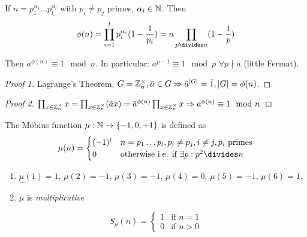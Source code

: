 \documentclass[NumTh.tex]{subfiles}
\begin{document}
\begin{prop}
  If $n = p_1^{\alpha_1} \dots p_l^{\alpha_l}$ with $p_i \neq p_j$ primes, $\alpha_i \in \mathbb{N}$.
  Then
  \[ \phi(n) = \prod_{i=1}^l p_i^{\alpha_i} (1 - \frac{1}{p_i}) = n \prod_{p\divides n} (1 - \frac{1}{p}) \]
\end{prop}

\begin{theorem}
  Then $a^{\phi(n)} \equiv 1 \mod n$.
  In particular: $a^{p-1} \equiv 1 \mod p$ $\forall p \nmid a$ (little Fermat).
\end{theorem}

\begin{proof}[Proof 1]
  Lagrange's Theorem, $G = \Z_n^\times, \overbar{a} \in G \Rightarrow \overbar{a}^{|G|} = \overbar{1}, |G| = \phi(n)$.
\end{proof}

\begin{proof}[Proof 2]
  $\prod_{x \in \Z_n^\times} x = \prod_{x \in \Z_n^\times} (\overbar{a}x) = \overbar{a}^{\phi(n)} \prod_{x \in \Z_n^\times} x \Rightarrow a^{\phi(n)} \equiv 1 \mod n$ 
\end{proof}

\begin{defi}
  The Möbius function $\mu: \mathbb{N} \to \{-1,0,+1\}$ is defined as
  \[
	\mu(n) = \begin{cases}
	  (-1)^l & n = p_1 \dots p_l, p_i \neq p_j, i \neq j, p_i \text{ primes} \\
	  0       & \text{otherwise i.e. if } \exists p: p^2 \divides n
	\end{cases}
  \]
\end{defi}

\begin{rem}\hfill
  \begin{enumerate}
    \item $\mu(1) = 1$, $\mu(2) = -1$, $\mu(3) = -1$, $\mu(4) = 0$, $\mu(5) = -1$, $\mu(6) = 1$, $\dots$
    \item $\mu$ is \emph{multiplicative}
  \end{enumerate}
\end{rem}

\begin{lemma}
  \[
    S_\mu(n) = \begin{cases}
      1 & \text{if } n=1 \\
      0 & \text{if } n>0
    \end{cases}
  \]
\end{lemma}
\end{document}
